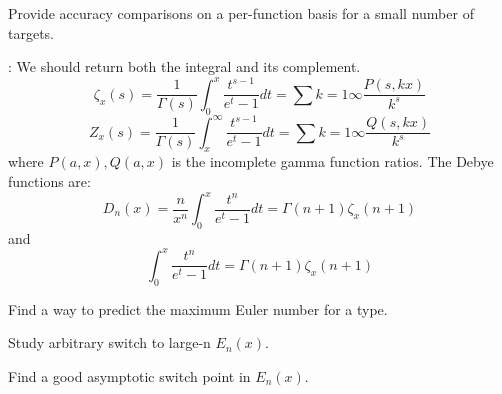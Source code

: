 
\begin{DoxyRefList}
\item[\label{todo__todo000001}%
\hypertarget{todo__todo000001}{}%
page \hyperlink{index}{Mathematical Special Functions} ]Provide accuracy comparisons on a per-\/function basis for a small number of targets. 
\item[\label{todo__todo000015}%
\hypertarget{todo__todo000015}{}%
Member \hyperlink{namespacestd_1_1____detail_a26d3f285cfbcaba6fa30d3e4164c6187}{std\+:\+:\+\_\+\+\_\+detail\+:\+:\+\_\+\+\_\+debye} (unsigned int \+\_\+\+\_\+n, \+\_\+\+Tp \+\_\+\+\_\+x)]\+: We should return both the integral and it\textquotesingle{}s complement. \[ \zeta_x(s) = \frac{1}{\Gamma(s)}\int_{0}^{x}\frac{t^{s-1}}{e^t-1}dt = \sum{k=1}{\infty}\frac{P(s,kx)}{k^s} \] \[ Z_x(s) = \frac{1}{\Gamma(s)}\int_{x}^{\infty}\frac{t^{s-1}}{e^t-1}dt = \sum{k=1}{\infty}\frac{Q(s,kx)}{k^s} \] where $ P(a,x), Q(a,x) $ is the incomplete gamma function ratios. The Debye functions are\+: \[ D_n(x) = \frac{n}{x^n}\int_{0}^{x}\frac{t^n}{e^t-1}dt = \Gamma(n+1)\zeta_x(n+1) \] and \[ \int_{0}^{x}\frac{t^n}{e^t-1}dt = \Gamma(n+1)\zeta_x(n+1) \]  
\item[\label{todo__todo000004}%
\hypertarget{todo__todo000004}{}%
Member \hyperlink{namespacestd_1_1____detail_a2e3eb67dee4d0b5c96824a4e8e9c227e}{std\+:\+:\+\_\+\+\_\+detail\+:\+:\+\_\+\+\_\+euler\+\_\+series} (unsigned int \+\_\+\+\_\+n)]Find a way to predict the maximum Euler number for a type.  
\item[\label{todo__todo000007}%
\hypertarget{todo__todo000007}{}%
Member \hyperlink{namespacestd_1_1____detail_a0282700710ec07b8ca095fe2ec140d6e}{std\+:\+:\+\_\+\+\_\+detail\+:\+:\+\_\+\+\_\+expint} (unsigned int \+\_\+\+\_\+n, \+\_\+\+Tp \+\_\+\+\_\+x)]Study arbitrary switch to large-\/n $ E_n(x) $. 

Find a good asymptotic switch point in $ E_n(x) $. 


\end{DoxyRefList}
